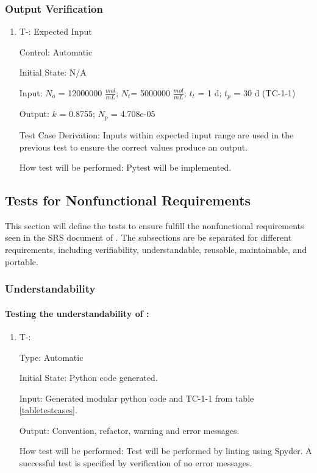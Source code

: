 \documentclass[12pt, titlepage]{article}
\newcounter{tinnum} %
\begin{document}
\subsubsection{Output Verification}\label{TO-1-1}

\begin{enumerate}

\item{T-}\thetinnum\label{T-8}: Expected Input

Control: Automatic
					
Initial State: N/A
					
Input: $N_{o}$ = 12000000 $\frac{mol}{mL}$; $N_{t}$= 5000000 $\frac{mol}{mL}$; 
$t_{t}$ = 1 d; $t_{p}$ = 30 d (TC-1-1)
					
Output: $k$ = 0.8755; $N_p$ = 4.708e-05

Test Case Derivation: Inputs within expected input range are used in the 
previous test to ensure the correct values produce an output.
					
How test will be performed: Pytest will be implemented.


\end{enumerate}


\subsection{Tests for Nonfunctional Requirements} \label{tnfr}
  
This section will define the tests to ensure \progname{} fulfill the 
nonfunctional requirements seen in the SRS document of \progname{}. The 
subsections are be separated for different requirements, including 
verifiability, understandable, reusable, maintainable, and portable.


\subsubsection{Understandability} \label{nonfunc_understability}

\paragraph{Testing the understandability of \progname{}:}
\begin{enumerate}

\item{T-}\thetinnum\label{T-9}:

Type: Automatic
					
Initial State: Python code generated.
					
Input: Generated modular python code and TC-1-1 from table \ref{tabletestcases}.
					
Output: Convention, refactor, warning and error messages.
					
How test will be performed: Test will be performed by linting using Spyder. A successful test is specified by verification of no error messages.
				

\end{enumerate}
\end{document}
